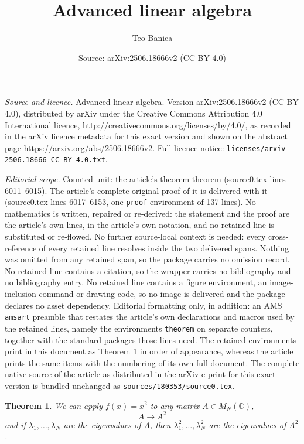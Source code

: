 \documentclass[10pt,a4paper]{amsart}
\title{Advanced linear algebra}
\author{Teo Banica}
\date{Source: arXiv:2506.18666v2 (CC BY 4.0)}
\newtheorem{theorem}{Theorem}
\begin{document}
\maketitle

\noindent\emph{Source and licence.} Advanced linear algebra. Version arXiv:2506.18666v2 (CC BY 4.0), distributed by arXiv under the Creative Commons Attribution 4.0 International licence, http://creativecommons.org/licenses/by/4.0/, as recorded in the arXiv licence metadata for this exact version and shown on the abstract page https://arxiv.org/abs/2506.18666v2. Full licence notice: \texttt{licenses/arxiv-2506.18666-CC-BY-4.0.txt}.\par\smallskip

\noindent\textit{Editorial scope.} Counted unit: the article's theorem theorem (source0.tex lines 6011--6015). The article's complete original proof of it is delivered with it (source0.tex lines 6017--6153, one \texttt{proof} environment of 137 lines). No mathematics is written, repaired or re-derived: the statement and the proof are the article's own lines, in the article's own notation, and no retained line is substituted or re-flowed.  No further source-local context is needed: every cross-reference of every retained line resolves inside the two delivered spans.  Nothing was omitted from any retained span, so the package carries no omission record.  No retained line contains a citation, so the wrapper carries no bibliography and no bibliography entry.  No retained line contains a figure environment, an image-inclusion command or drawing code, so no image is delivered and the package declares no asset dependency.  Editorial formatting only, in addition: an AMS \texttt{amsart} preamble that restates the article's own declarations and macros used by the retained lines, namely the environments \texttt{theorem} on separate counters, together with the standard packages those lines need.  The retained environments print in this document as Theorem 1 in order of appearance, whereas the article prints the same items with the numbering of its own full document.  The complete native source of the article as distributed in the arXiv e-print for this exact version is bundled unchanged as \texttt{sources/180353/source0.tex}.
\begin{theorem}
We can apply $f(x)=x^2$ to any matrix $A\in M_N(\mathbb C)$, 
$$A\to A^2$$
and if $\lambda_1,\ldots,\lambda_N$ are the eigenvalues of $A$, then $\lambda_1^2,\ldots,\lambda_N^2$ are the eigenvalues of $A^2$.
\end{theorem}
\end{document}
